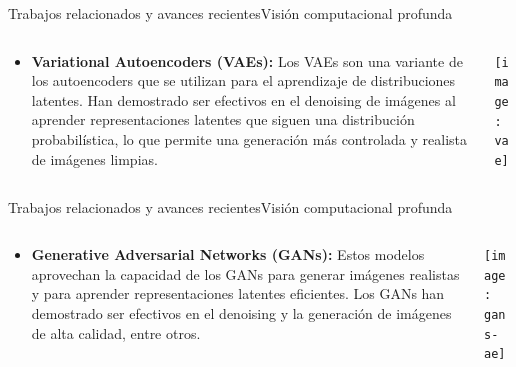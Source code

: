 \documentclass[10pt,border=3pt,tikz]{beamer}
\begin{document}
    \begin{frame}{Trabajos relacionados y avances recientes}{Visión computacional profunda}
        \begin{columns}
            \begin{column}{0.55\textwidth}
                \begin{itemize}
                    \item \textbf{Variational Autoencoders (VAEs):} Los VAEs son una variante de los autoencoders que se utilizan para el aprendizaje de distribuciones latentes. Han demostrado ser efectivos en el denoising de imágenes al aprender representaciones latentes que siguen una distribución probabilística, lo que permite una generación más controlada y realista de imágenes limpias.
                \end{itemize}
            \end{column}
            \begin{column}{0.4\textwidth}
                \begin{center}
                    \texttt{[image: vae]}
                \end{center}
            \end{column}
        \end{columns}
    \end{frame}
    
    \begin{frame}{Trabajos relacionados y avances recientes}{Visión computacional profunda}
        \begin{columns}
            \begin{column}{0.55\textwidth}
                \begin{itemize}
                    \item \textbf{Generative Adversarial Networks (GANs):} Estos modelos aprovechan la capacidad de los GANs para generar imágenes realistas y para aprender representaciones latentes eficientes. Los GANs han demostrado ser efectivos en el denoising y la generación de imágenes de alta calidad, entre otros.
                \end{itemize}
            \end{column}
            \begin{column}{0.4\textwidth}
                \begin{center}
                    \texttt{[image: gans-ae]}
                \end{center}
            \end{column}
        \end{columns}
    \end{frame}
    
\end{document}
